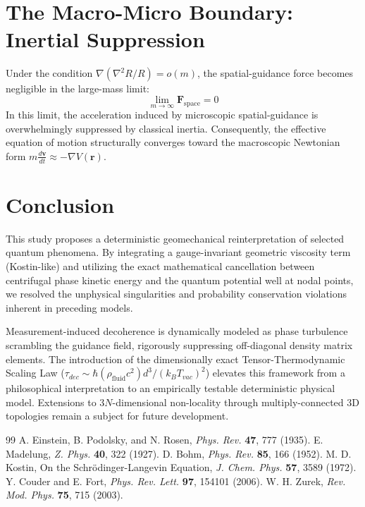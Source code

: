 \documentclass[reprint,amsmath,amssymb,aps,prd]{revtex4-2}
\begin{document}
\section{The Macro-Micro Boundary: Inertial Suppression}
Under the condition $\nabla (\nabla^2 R/R) = o(m)$, the spatial-guidance force becomes negligible in the large-mass limit:
\begin{equation}
\lim_{m \to \infty} \mathbf{F}_{\mathrm{space}} = 0
\end{equation}
In this limit, the acceleration induced by microscopic spatial-guidance is overwhelmingly suppressed by classical inertia. Consequently, the effective equation of motion structurally converges toward the macroscopic Newtonian form $m \frac{d\mathbf{v}}{dt} \approx -\nabla V(\mathbf{r})$.

\section{Conclusion}
This study proposes a deterministic geomechanical reinterpretation of selected quantum phenomena. By integrating a gauge-invariant geometric viscosity term (Kostin-like) and utilizing the exact mathematical cancellation between centrifugal phase kinetic energy and the quantum potential well at nodal points, we resolved the unphysical singularities and probability conservation violations inherent in preceding models. 

Measurement-induced decoherence is dynamically modeled as phase turbulence scrambling the guidance field, rigorously suppressing off-diagonal density matrix elements. The introduction of the dimensionally exact Tensor-Thermodynamic Scaling Law ($\tau_{dec} \sim \hbar (\rho_{\mathrm{fluid}} c^2) d^3 / (k_B T_{vac})^2$) elevates this framework from a philosophical interpretation to an empirically testable deterministic physical model. Extensions to $3N$-dimensional non-locality through multiply-connected 3D topologies remain a subject for future development.

\begin{thebibliography}{99}
 A. Einstein, B. Podolsky, and N. Rosen, \textit{Phys. Rev.} \textbf{47}, 777 (1935).
 E. Madelung, \textit{Z. Phys.} \textbf{40}, 322 (1927).
 D. Bohm, \textit{Phys. Rev.} \textbf{85}, 166 (1952).
 M. D. Kostin, On the Schrödinger-Langevin Equation, \textit{J. Chem. Phys.} \textbf{57}, 3589 (1972).
 Y. Couder and E. Fort, \textit{Phys. Rev. Lett.} \textbf{97}, 154101 (2006).
 W. H. Zurek, \textit{Rev. Mod. Phys.} \textbf{75}, 715 (2003).
\end{thebibliography}
\end{document}
